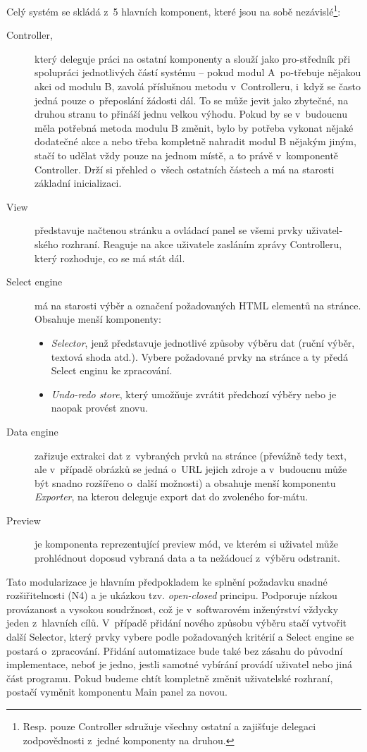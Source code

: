 \documentclass[thesis=B,czech]{FITthesis}[2012/06/26]
\begin{document}
Celý systém se skládá z~5 hlavních komponent, které jsou na sobě nezávislé\footnote{Resp. pouze Controller sdružuje všechny ostatní a zajišťuje delegaci zodpovědnosti z~jedné komponenty na druhou.}:
\begin{description}
	\item [Controller,] který deleguje práci na ostatní komponenty a slouží jako pro-středník při spolupráci jednotlivých částí systému -- pokud modul A~po-třebuje nějakou akci od modulu B, zavolá příslušnou metodu v~Controlleru, i~když se často jedná pouze o~přeposlání žádosti dál. To se může jevit jako zbytečné, na druhou stranu to přináší jednu velkou výhodu. Pokud by se v~budoucnu měla potřebná metoda modulu B změnit, bylo by potřeba vykonat nějaké dodatečné akce a nebo třeba kompletně nahradit modul B nějakým jiným, stačí to udělat vždy pouze na jednom místě, a to právě v~komponentě Controller. Drží si přehled o~všech ostatních částech a má na starosti základní inicializaci.
	\item [View] představuje načtenou stránku a ovládací panel se všemi prvky uživatel-ského rozhraní. Reaguje na akce uživatele zasláním zprávy Controlleru, který rozhoduje, co se má stát dál.
	\item [Select engine] má na starosti výběr a označení požadovaných HTML elementů na stránce. Obsahuje menší komponenty:
	\begin{itemize}
		\item \emph{Selector}, jenž představuje jednotlivé způsoby výběru dat (ruční výběr, textová shoda atd.). Vybere požadované prvky na stránce a ty předá Select enginu ke zpracování.
		\item \emph{Undo-redo store}, který umožňuje zvrátit předchozí výběry nebo je naopak provést znovu.
	\end{itemize}
	\item [Data engine] zařizuje extrakci dat z~vybraných prvků na stránce (převážně tedy text, ale v~případě obrázků se jedná o~URL jejich zdroje a v~budoucnu může být snadno rozšířeno o~další možnosti) a obsahuje menší komponentu \emph{Exporter}, na kterou deleguje export dat do zvoleného for-mátu.
	\item [Preview] je komponenta reprezentující preview mód, ve kterém si uživatel může prohlédnout doposud vybraná data a ta nežádoucí z~výběru odstranit.
\end{description}
Tato modularizace je hlavním předpokladem ke splnění požadavku snadné rozšiřitelnosti (N4) a je ukázkou tzv. \emph{open-closed} principu. Podporuje nízkou provázanost a vysokou soudržnost, což je v~softwarovém inženýrství vždycky jeden z~hlavních cílů. V~případě přidání nového způsobu výběru stačí vytvořit další Selector, který prvky vybere podle požadovaných kritérií a Select engine se postará o~zpracování. Přidání automatizace bude také bez zásahu do původní implementace, neboť je jedno, jestli samotné vybírání provádí uživatel nebo jiná část programu. Pokud budeme chtít kompletně změnit uživatelské rozhraní, postačí vyměnit komponentu Main panel za novou.
\end{document}
